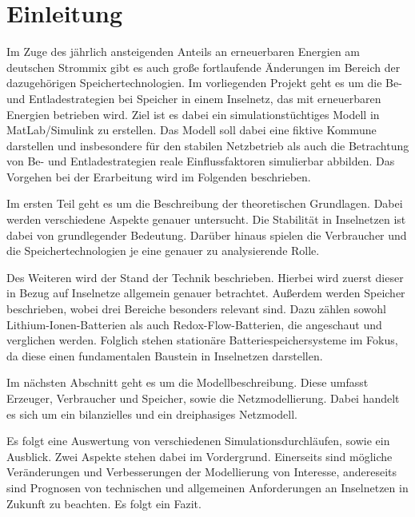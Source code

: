 \chapter{Einleitung}

Im Zuge des jährlich ansteigenden Anteils an erneuerbaren Energien am deutschen Strommix gibt es auch große fortlaufende Änderungen im Bereich der dazugehörigen Speichertechnologien. 
Im vorliegenden Projekt geht es um die Be- und Entladestrategien bei Speicher in einem Inselnetz, das mit erneuerbaren Energien betrieben wird. 
Ziel ist es dabei ein simulationstüchtiges Modell in MatLab/Simulink zu erstellen. 
Das Modell soll dabei eine fiktive Kommune darstellen und insbesondere für den stabilen Netzbetrieb als auch die Betrachtung von Be- und Entladestrategien reale Einflussfaktoren simulierbar abbilden.
Das Vorgehen bei der Erarbeitung wird im Folgenden beschrieben.

Im ersten Teil geht es um die Beschreibung der theoretischen Grundlagen. 
Dabei werden verschiedene Aspekte genauer untersucht.
Die Stabilität in Inselnetzen ist dabei von grundlegender Bedeutung.
Darüber hinaus spielen die Verbraucher und die Speichertechnologien je eine genauer zu analysierende Rolle.

Des Weiteren wird der Stand der Technik beschrieben.
Hierbei wird zuerst dieser in Bezug auf Inselnetze allgemein genauer betrachtet.
Außerdem werden Speicher beschrieben, wobei drei Bereiche besonders relevant sind.
Dazu zählen sowohl Lithium-Ionen-Batterien als auch Redox-Flow-Batterien, die angeschaut und verglichen werden. 
Folglich stehen stationäre Batteriespeichersysteme im Fokus, da diese einen fundamentalen Baustein in Inselnetzen darstellen.

Im nächsten Abschnitt geht es um die Modellbeschreibung.
Diese umfasst Erzeuger, Verbraucher und Speicher, sowie die Netzmodellierung.
Dabei handelt es sich um ein bilanzielles und ein dreiphasiges Netzmodell.

Es folgt eine Auswertung von verschiedenen Simulationsdurchläufen, sowie ein Ausblick.
Zwei Aspekte stehen dabei im Vordergrund.
Einerseits sind mögliche Veränderungen und Verbesserungen der Modellierung von Interesse, andereseits sind Prognosen von technischen und allgemeinen Anforderungen an Inselnetzen in Zukunft zu beachten.
Es folgt ein Fazit.
